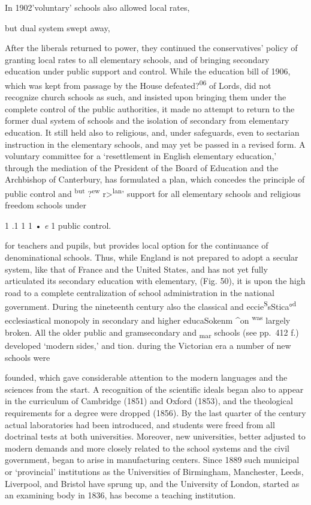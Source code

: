 \documentclass[]{book}
\begin{document}
In 1902'voluntary' schools also allowed local rates,

but dual system swept away,

After the liberals returned to power, they continued the conservatives' policy of granting local rates to all elementary schools, and of bringing secondary education under public support and control. While the education bill of 1906, which was kept from passage by the House defeated?\textsuperscript{06} of Lords, did not recognize church schools as such, and insisted upon bringing them under the complete control of the public authorities, it made no attempt to return to the former dual system of schools and the isolation of secondary from elementary education. It still held also to religious, and, under safeguards, even to sectarian instruction in the elementary schools, and may yet be passed in a revised form. A voluntary committee for a `resettlement in English elementary education,' through the mediation of the President of the Board of Education and the Archbishop of Canterbury, has formulated a plan, which concedes the principle of public control and \textsuperscript{but} ?\textsuperscript{ew} r\textgreater{}\textsuperscript{lan}' support for all elementary schools and religious freedom schools under

1 .1 1 1 • \emph{e} 1 public control.

for teachers and pupils, but provides local option for the continuance of denominational schools. Thus, while England is not prepared to adopt a secular system, like that of France and the United States, and has not yet\protect\hypertarget{ch25.xmlux5cux23para.469.1.0.box.78.230.1265.476.q.50}{}{ fully articulated its secondary education with elementary, (Fig. 50), it is upon the high road to a complete centralization of school administration in the national government. During the nineteenth century also the classical and eccie\textsuperscript{S}sStica°\textsuperscript{d} ecclesiastical monopoly in secondary and higher educaSokenm \^{}on \textsuperscript{was} largely broken. All the older public and gramsecondary and \textsubscript{mar} schools (see pp.~412 f.) developed `modern sides,' and tion. during the Victorian era a number of new schools were}

founded, which gave considerable attention to the modern languages and the sciences from the start. A recognition of the scientific ideals began also to appear in the curriculum of Cambridge (1851) and Oxford (1853), and the theological requirements for a degree were dropped (1856). By the last quarter of the century actual laboratories had been introduced, and students were freed from all doctrinal tests at both universities. Moreover, new universities, better adjusted to modern demands and more closely related to the school systems and the civil government, began to arise in manufacturing centers. Since 1889 such municipal or `provincial' institutions as the Universities of Birmingham, Manchester, Leeds, Liverpool, and Bristol have sprung up, and the University of London, started as an examining body in 1836, has become a teaching institution.
\end{document}
